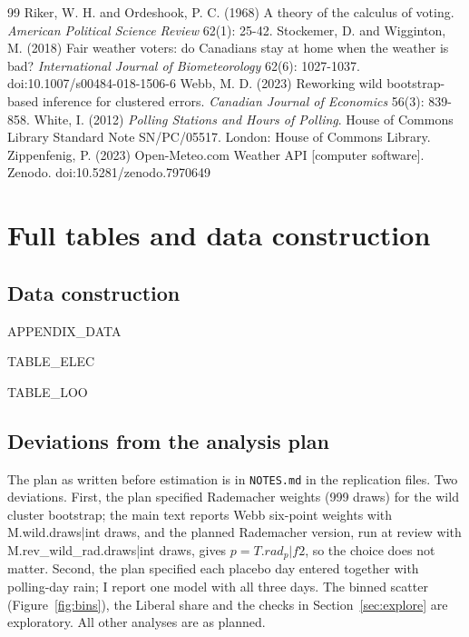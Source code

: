 \documentclass[11pt,a4paper]{article}
\begin{document}
\begin{thebibliography}{99}
 Riker, W. H. and Ordeshook, P. C. (1968) A theory of the calculus of voting. \textit{American Political Science Review} 62(1): 25-42.
 Stockemer, D. and Wigginton, M. (2018) Fair weather voters: do Canadians stay at home when the weather is bad? \textit{International Journal of Biometeorology} 62(6): 1027-1037. doi:10.1007/s00484-018-1506-6
 Webb, M. D. (2023) Reworking wild bootstrap-based inference for clustered errors. \textit{Canadian Journal of Economics} 56(3): 839-858.
 White, I. (2012) \textit{Polling Stations and Hours of Polling}. House of Commons Library Standard Note SN/PC/05517. London: House of Commons Library.
 Zippenfenig, P. (2023) Open-Meteo.com Weather API [computer software]. Zenodo. doi:10.5281/zenodo.7970649
\end{thebibliography}

\appendix
\section{Full tables and data construction}
\subsection{Data construction}
{{APPENDIX_DATA}}

{{TABLE_ELEC}}

{{TABLE_LOO}}

\subsection{Deviations from the analysis plan}
The plan as written before estimation is in \texttt{NOTES.md} in the replication files. Two deviations. First, the plan specified Rademacher weights (999 draws) for the wild cluster bootstrap; the main text reports Webb six-point weights \citep{webb2023} with {{M.wild.draws|int}} draws, and the planned Rademacher version, run at review with {{M.rev_wild_rad.draws|int}} draws, gives $p={{T.rad_p|f2}}$, so the choice does not matter. Second, the plan specified each placebo day entered together with polling-day rain; I report one model with all three days. The binned scatter (Figure~\ref{fig:bins}), the Liberal share and the checks in Section~\ref{sec:explore} are exploratory. All other analyses are as planned.
\end{document}

